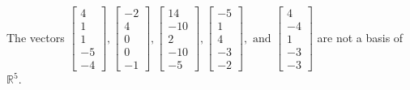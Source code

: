 \begin{exercise}
\begin{exerciseStatement}
  \end{exerciseStatement}
  \begin{exerciseAnswer}
   The vectors \(\left[\begin{array}{r}
4 \\
1 \\
1 \\
-5 \\
-4
\end{array}\right] , \left[\begin{array}{r}
-2 \\
4 \\
0 \\
0 \\
-1
\end{array}\right] , \left[\begin{array}{r}
14 \\
-10 \\
2 \\
-10 \\
-5
\end{array}\right] , \left[\begin{array}{r}
-5 \\
1 \\
4 \\
-3 \\
-2
\end{array}\right] , \text{ and } \left[\begin{array}{r}
4 \\
-4 \\
1 \\
-3 \\
-3
\end{array}\right]\) 
  	 are not  a basis of \(\mathbb{R}^5\).
  


  \end{exerciseAnswer}
\end{exercise}